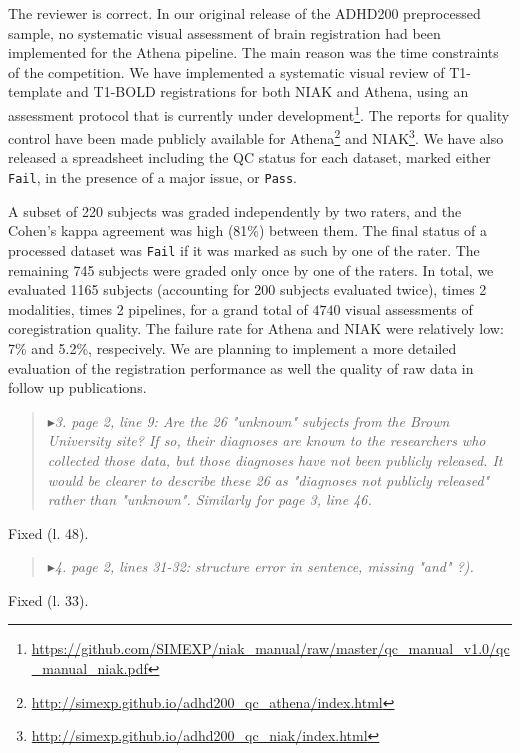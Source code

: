 \documentclass[authoryear,3p]{elsarticle}
\begin{document}
The reviewer is correct. In our original release of the ADHD200 preprocessed sample, no systematic visual assessment of brain registration had been implemented for the Athena pipeline. The main reason was the time constraints of the competition. We have implemented a systematic visual review of T1-template and T1-BOLD registrations for both NIAK and Athena, using an assessment protocol that is currently under development\footnote{\url{https://github.com/SIMEXP/niak_manual/raw/master/qc_manual_v1.0/qc_manual_niak.pdf}}. The reports for quality control have been made publicly available for Athena\footnote{\url{http://simexp.github.io/adhd200_qc_athena/index.html}} and NIAK\footnote{\url{http://simexp.github.io/adhd200_qc_niak/index.html}}. We have also released a spreadsheet including the QC status for each dataset, marked either \texttt{Fail}, in the presence of a major issue, or \texttt{Pass}. 
\par 
A subset of 220 subjects was graded independently by two raters, and the Cohen's kappa agreement was high (81\%) between them. The final status of a processed dataset was \texttt{Fail} if it was marked as such by one of the rater. The remaining 745 subjects were graded only once by one of the raters. In total, we evaluated 1165 subjects (accounting for 200 subjects evaluated twice), times 2 modalities, times 2 pipelines, for a grand total of $4740$ visual assessments of coregistration quality. The failure rate for Athena and NIAK were relatively low: 7\% and 5.2\%, respecively. We are planning to implement a more detailed evaluation of the registration performance as well the quality of raw data in follow up publications. 

\begin{quote}
$\blacktriangleright$\emph{3. page 2, line 9: Are the 26 "unknown" subjects from the Brown University site? If so, their diagnoses are known to the researchers who collected those data, but those diagnoses have not been publicly released. It would be clearer to describe these 26 as "diagnoses not publicly released" rather than "unknown". Similarly for page 3, line 46.}
\end{quote}

Fixed (l. 48). 

\begin{quote}
$\blacktriangleright$\emph{4. page 2, lines 31-32: structure error in sentence, missing "and" ?). 
}
\end{quote}

Fixed (l. 33).
\end{document}
